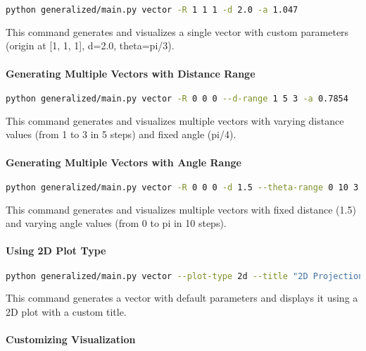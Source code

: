 \begin{lstlisting}[language=bash]
python generalized/main.py vector -R 1 1 1 -d 2.0 -a 1.047
\end{lstlisting}

This command generates and visualizes a single vector with custom parameters (origin at [1, 1, 1], d=2.0, theta=pi/3).

\paragraph{Generating Multiple Vectors with Distance Range}

\begin{lstlisting}[language=bash]
python generalized/main.py vector -R 0 0 0 --d-range 1 5 3 -a 0.7854
\end{lstlisting}

This command generates and visualizes multiple vectors with varying distance values (from 1 to 3 in 5 steps) and fixed angle (pi/4).

\paragraph{Generating Multiple Vectors with Angle Range}

\begin{lstlisting}[language=bash]
python generalized/main.py vector -R 0 0 0 -d 1.5 --theta-range 0 10 3.14159
\end{lstlisting}

This command generates and visualizes multiple vectors with fixed distance (1.5) and varying angle values (from 0 to pi in 10 steps).

\paragraph{Using 2D Plot Type}

\begin{lstlisting}[language=bash]
python generalized/main.py vector --plot-type 2d --title "2D Projection of Orthogonal Vector"
\end{lstlisting}

This command generates a vector with default parameters and displays it using a 2D plot with a custom title.

\paragraph{Customizing Visualization}

